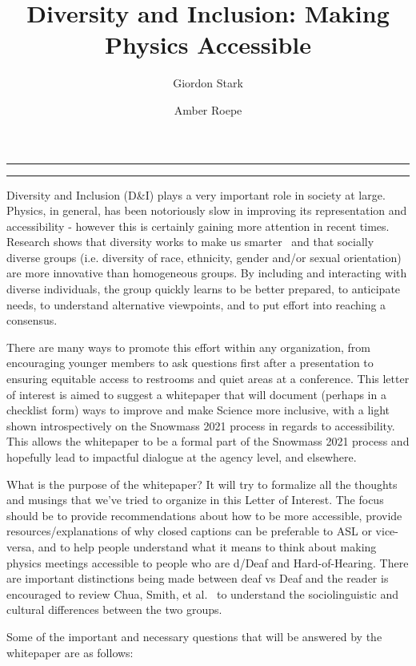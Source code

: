\documentclass{article}
\title{Diversity and Inclusion: Making Physics Accessible}
\author[a]{Giordon Stark}
\author[b]{Amber Roepe}
\affil[a]{SCIPP, UC Santa Cruz}
\affil[b]{University of Oklahoma}
\date{}
\begin{document}
\maketitle
\hrule
\vspace{0.5em}
\hrule
\vspace{2.5em}

  Diversity and Inclusion (D\&I) plays a very important role in society at large. Physics, in general, has been notoriously slow in improving its representation and accessibility - however this is certainly gaining more attention in recent times. Research shows that diversity works to make us smarter~\cite{HowDiversityWorks} and that socially diverse groups (i.e. diversity of race, ethnicity, gender and/or sexual orientation) are more innovative than homogeneous groups. By including and interacting with diverse individuals, the group quickly learns to be better prepared, to anticipate needs, to understand alternative viewpoints, and to put effort into reaching a consensus.

  There are many ways to promote this effort within any organization, from encouraging younger members to ask questions first after a presentation to ensuring equitable access to restrooms and quiet areas at a conference. This letter of interest is aimed to suggest a whitepaper that will document (perhaps in a checklist form) ways to improve and make Science more inclusive, with a light shown introspectively on the Snowmass 2021 process in regards to accessibility. This allows the whitepaper to be a formal part of the Snowmass 2021 process and hopefully lead to impactful dialogue at the agency level, and elsewhere.

  What is the purpose of the whitepaper? It will try to formalize all the thoughts and musings that we've tried to organize in this Letter of Interest. The focus should be to provide recommendations about how to be more accessible, provide resources/explanations of why closed captions can be preferable to ASL or vice-versa, and to help people understand what it means to think about making physics meetings accessible to people who are d/Deaf and Hard-of-Hearing. There are important distinctions being made between deaf vs Deaf and the reader is encouraged to review Chua, Smith, et al.~\cite{asee_peer_32676} to understand the sociolinguistic and cultural differences between the two groups.

  Some of the important and necessary questions that will be answered by the whitepaper are as follows:
\end{document}
